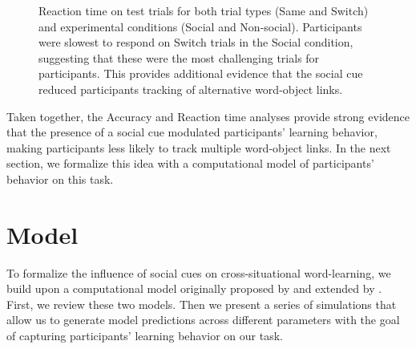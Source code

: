 \documentclass[man]{apa2}
\begin{document}
%
\begin{figure}[H]
	\centering
	\caption{Reaction time on test trials for both trial types (Same and Switch) and experimental conditions (Social and Non-social). Participants were slowest to respond on Switch trials in the Social condition, suggesting that these were the most challenging trials for participants. This provides additional evidence that the social cue reduced participants tracking of alternative word-object links.}
\end{figure}
%


Taken together, the Accuracy and Reaction time analyses provide strong evidence that the presence of a social cue modulated participants' learning behavior, making participants less likely to track multiple word-object links. In the next section, we formalize this idea with a computational model of participants' behavior on this task.


\section{Model}

To formalize the influence of social cues on cross-situational word-learning, we build upon a computational model originally proposed by  and extended by . First, we review these two models. Then we present a series of simulations that allow us to generate model predictions across different parameters with the goal of capturing participants' learning behavior on our task.
\end{document}
